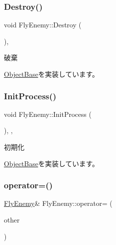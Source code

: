 \mbox{\label{class_fly_enemy_af7ce5137e8eb2e8cc6654fbbdbc714cd}} 
\subsubsection{\texorpdfstring{Destroy()}{Destroy()}}
{\footnotesize\ttfamily void Fly\+Enemy\+::\+Destroy (\begin{DoxyParamCaption}{ }\end{DoxyParamCaption})\hspace{0.3cm}{\ttfamily [final]}, {\ttfamily [virtual]}}



破棄 



\mbox{\hyperlink{class_object_base_a7fa4c548153c3af20f89673ffea809af}{Object\+Base}}を実装しています。

\mbox{\label{class_fly_enemy_afe4ddbf7089952146443f4ca71f55b13}} 
\subsubsection{\texorpdfstring{Init\+Process()}{InitProcess()}}
{\footnotesize\ttfamily void Fly\+Enemy\+::\+Init\+Process (\begin{DoxyParamCaption}{ }\end{DoxyParamCaption})\hspace{0.3cm}{\ttfamily [final]}, {\ttfamily [protected]}, {\ttfamily [virtual]}}



初期化 



\mbox{\hyperlink{class_object_base_af133f36f2bca1dcfd962e2cfac61ab51}{Object\+Base}}を実装しています。

\mbox{\label{class_fly_enemy_a6cc3f3701b503020620c02667705fd23}} 
\subsubsection{\texorpdfstring{operator=()}{operator=()}}
{\footnotesize\ttfamily \mbox{\hyperlink{class_fly_enemy}{Fly\+Enemy}}\& Fly\+Enemy\+::operator= (\begin{DoxyParamCaption}\item[{const \mbox{\hyperlink{class_fly_enemy}{Fly\+Enemy}} \&}]{other }\end{DoxyParamCaption})\hspace{0.3cm}{\ttfamily [inline]}}



